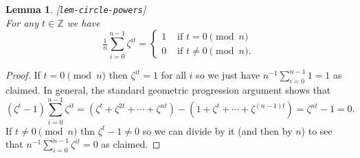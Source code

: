 \documentclass{amsart}
\newcommand{\lbl}[1]{\label{#1}\textup{[\texttt{#1}]}\ \\}
\newcommand{\lbl}{\label}
\newcommand{\Z}         {{\mathbb{Z}}}
\newcommand{\zt}        {\zeta}
\renewcommand{\:}{\colon}
\newtheorem{lemma}[theorem]{Lemma}
\theoremstyle{definition}
\begin{document}
\begin{lemma}\lbl{lem-circle-powers}
 For any $t\in\Z$ we have 
 \[ \tfrac{1}{n} \sum_{i=0}^{n-1}\zt^{it} = 
     \begin{cases} 
       1 & \text{ if } t = 0\pmod{n} \\
       0 & \text{ if } t\neq 0\pmod{n}.
      \end{cases}
 \]
\end{lemma}
\begin{proof}
 If $t=0\pmod{n}$ then $\zt^{it}=1$ for all $i$ so we just have
 $n^{-1}\sum_{i=0}^{n-1}1=1$ as claimed.  In general, the standard
 geometric progression argument shows that 
 \[ (\zt^t-1)\sum_{i=0}^{n-1} \zt^{it} = 
     (\zt^t+\zt^{2t}+\dotsb+\zt^{nt}) - 
     (1+\zt^{t}+\dotsb+\zt^{(n-1)t}) = \zt^{nt}-1 = 0. 
 \]
 If $t\neq 0\pmod{n}$ thn $\zt^t-1\neq 0$ so we can divide by it (and
 then by $n$) to see that $n^{-1}\sum_{i=0}^{n-1}\zt^{it}=0$ as
 claimed. 
\end{proof}
\end{document}
